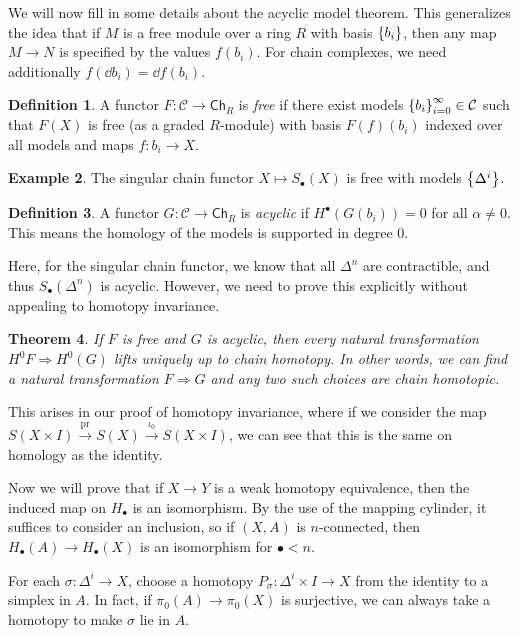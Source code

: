 \documentclass[leqno, openany]{memoir}
\newtheorem{thm}{Theorem}[section]
\theoremstyle{definition}
\newtheorem{defn}[thm]{Definition}
\newtheorem{exm}[thm]{Example}
\theoremstyle{remark}
\theoremstyle{plain}
\theoremstyle{definition}
\theoremstyle{remark}
\newcommand{\mc}[1]{\mathcal{#1}}
\newcommand{\mr}[1]{\mathrm{#1}}
\newcommand{\ms}[1]{\mathsf{#1}}
\begin{document}
We will now fill in some details about the acyclic model theorem. This generalizes the idea that if $M$ is a free module over a ring $R$ with basis $\qty{b_i}$, then any map $M \to N$ is specified by the values $f(b_i)$. For chain complexes, we need additionally $f(\dd b_i) = \dd{f(b_i)}$.

\begin{defn}
    A functor $F \colon \mc{C} \to \ms{Ch}_R$ is \textit{free} if there exist models $\qty{b_i}_{i=0}^{\infty} \in \mc{C}$ such that $F(X)$ is free (as a graded $R$-module) with basis $F(f) (b_i)$ indexed over all models and maps $f \colon b_i \to X$.
\end{defn}

\begin{exm}
    The singular chain functor $X \mapsto S_{\bullet}(X)$ is free with models $\qty{\Delta^i}$.
\end{exm}

\begin{defn}
    A functor $G \colon \mc{C} \to \ms{Ch}_R$ is \textit{acyclic} if $H^{\bullet} (G(b_i)) = 0$ for all $\alpha \neq 0$. This means the homology of the models is supported in degree $0$.
\end{defn}

Here, for the singular chain functor, we know that all $\Delta^n$ are contractible, and thus $S_{\bullet}(\Delta^n)$ is acyclic. However, we need to prove this explicitly without appealing to homotopy invariance.

\begin{thm}
    If $F$ is free and $G$ is acyclic, then every natural transformation $H^0 F \Rightarrow H^0(G)$ lifts uniquely up to chain homotopy. In other words, we can find a natural transformation $F \Rightarrow G$ and any two such choices are chain homotopic.
\end{thm}

This arises in our proof of homotopy invariance, where if we consider the map $S(X \times I) \xrightarrow{\mr{pr}} S(X) \xrightarrow{\iota_0} S(X \times I)$, we can see that this is the same on homology as the identity.

Now we will prove that if $X \to Y$ is a weak homotopy equivalence, then the induced map on $H_{\bullet}$ is an isomorphism. By the use of the mapping cylinder, it suffices to consider an inclusion, so if $(X, A)$ is $n$-connected, then $H_{\bullet}(A) \to H_{\bullet}(X)$ is an isomorphism for $\bullet < n$.

For each $\sigma \colon \Delta^i \to X$, choose a homotopy $P_{\sigma} \colon \Delta^i \times I \to X$ from the identity to a simplex in $A$. In fact, if $\pi_0(A) \to \pi_0(X)$ is surjective, we can always take a homotopy to make $\sigma$ lie in $A$.
\end{document}
